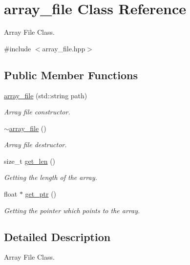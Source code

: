\hypertarget{classarray__file}{}\section{array\+\_\+file Class Reference}
\label{classarray__file}


Array File Class.  




{\ttfamily \#include $<$array\+\_\+file.\+hpp$>$}

\subsection*{Public Member Functions}
\begin{DoxyCompactItemize}
\item 
\hyperlink{classarray__file_aed62743d4e948e84170eee630fb7fc99}{array\+\_\+file} (std\+::string path)
\begin{DoxyCompactList}\small\item\em Array file constructor. \end{DoxyCompactList}\item 
\mbox{\label{classarray__file_a5101e756e2716284e64e0161ef5cdfff}} 
\hyperlink{classarray__file_a5101e756e2716284e64e0161ef5cdfff}{$\sim$array\+\_\+file} ()
\begin{DoxyCompactList}\small\item\em Array file destructor. \end{DoxyCompactList}\item 
size\+\_\+t \hyperlink{classarray__file_a3add9229dd47d68e0fa4a3e2e3c5e1e1}{get\+\_\+len} ()
\begin{DoxyCompactList}\small\item\em Getting the length of the array. \end{DoxyCompactList}\item 
float $\ast$ \hyperlink{classarray__file_a5a139068e2410f90766ca94a5ab93f11}{get\+\_\+ptr} ()
\begin{DoxyCompactList}\small\item\em Getting the pointer which points to the array. \end{DoxyCompactList}\end{DoxyCompactItemize}


\subsection{Detailed Description}
Array File Class. 

